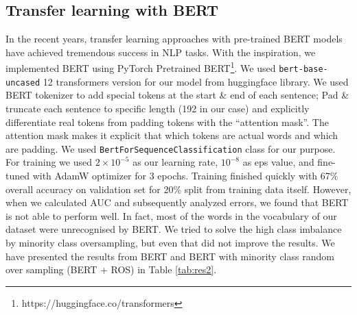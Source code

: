 \subsection{Transfer learning with BERT}
In the recent years, transfer learning approaches with pre-trained BERT\cite{devlin2018bert} models have achieved tremendous success in NLP tasks. With the inspiration, we implemented BERT using PyTorch Pretrained BERT\footnote{https://huggingface.co/transformers}.
We used \verb|bert-base-uncased| 12 transformers version for our model from huggingface library. We used BERT tokenizer to add special tokens at the start \& end of each sentence; 
Pad \& truncate each sentence to specific length (192 in our case) and explicitly differentiate real tokens from padding tokens with the ``attention mask''. The attention mask makes it explicit that which tokens are actual words and  which are padding. We used \verb|BertForSequenceClassification| class for our purpose. For training we used $2 \times 10^{-5}$ as our learning rate, $10^{-8}$ as eps value, and fine-tuned with AdamW optimizer for 3 epochs. Training finished quickly with 67\% overall accuracy on validation set for 20\% split from training data itself. However, when we calculated AUC and subsequently analyzed errors, we found that BERT is not able to perform well. In fact, most of the words in the vocabulary of our dataset were unrecognised by BERT.  We tried to solve the high class imbalance by minority class oversampling, but even that did not improve the results. We have presented the results from BERT and BERT with minority class random over sampling (BERT + ROS) in Table \ref{tab:res2}.


